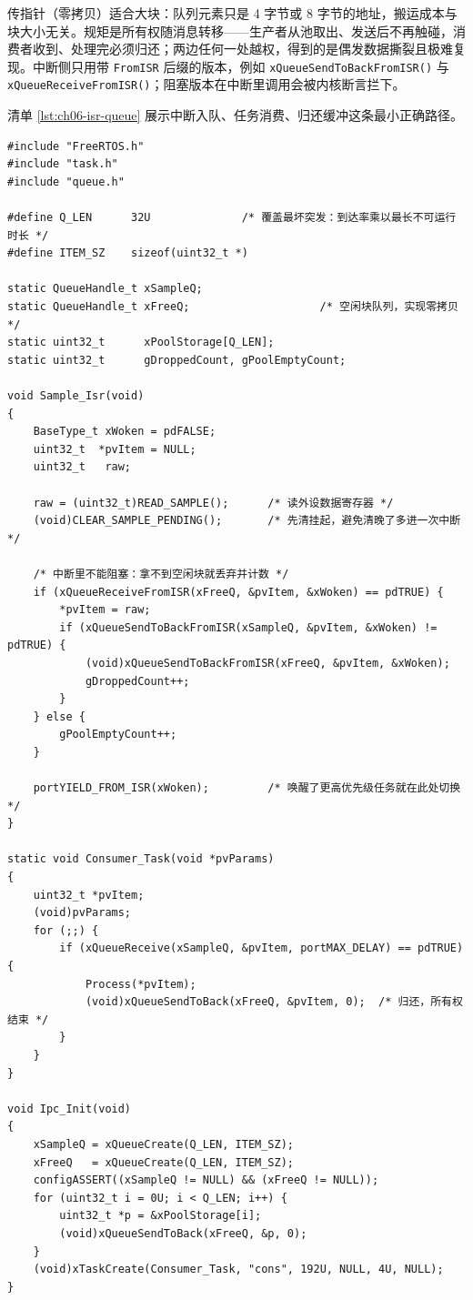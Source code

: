 \documentclass[12pt,a4paper,fontset=fandol]{ctexbook}
\newcommand{\Fn}[1]{\texttt{#1()}}
\newcommand{\Tp}[1]{\texttt{#1}}
\begin{document}
传指针（零拷贝）适合大块：队列元素只是 4 字节或 8 字节的地址，搬运成本与块大小无关。规矩是所有权随消息转移——生产者从池取出、发送后不再触碰，消费者收到、处理完必须归还；两边任何一处越权，得到的是偶发数据撕裂且极难复现。中断侧只用带 \Tp{FromISR} 后缀的版本，例如 \Fn{xQueueSendToBackFromISR} 与 \Fn{xQueueReceiveFromISR}；阻塞版本在中断里调用会被内核断言拦下。

清单 \ref{lst:ch06-isr-queue} 展示中断入队、任务消费、归还缓冲这条最小正确路径。

\begin{lstlisting}[style=cstyle,caption={C：中断经队列唤醒消费者，并用空闲块队列传递所有权},label={lst:ch06-isr-queue}]
#include "FreeRTOS.h"
#include "task.h"
#include "queue.h"

#define Q_LEN      32U              /* 覆盖最坏突发：到达率乘以最长不可运行时长 */
#define ITEM_SZ    sizeof(uint32_t *)

static QueueHandle_t xSampleQ;
static QueueHandle_t xFreeQ;                    /* 空闲块队列，实现零拷贝 */
static uint32_t      xPoolStorage[Q_LEN];
static uint32_t      gDroppedCount, gPoolEmptyCount;

void Sample_Isr(void)
{
    BaseType_t xWoken = pdFALSE;
    uint32_t  *pvItem = NULL;
    uint32_t   raw;

    raw = (uint32_t)READ_SAMPLE();      /* 读外设数据寄存器 */
    (void)CLEAR_SAMPLE_PENDING();       /* 先清挂起，避免清晚了多进一次中断 */

    /* 中断里不能阻塞：拿不到空闲块就丢弃并计数 */
    if (xQueueReceiveFromISR(xFreeQ, &pvItem, &xWoken) == pdTRUE) {
        *pvItem = raw;
        if (xQueueSendToBackFromISR(xSampleQ, &pvItem, &xWoken) != pdTRUE) {
            (void)xQueueSendToBackFromISR(xFreeQ, &pvItem, &xWoken);
            gDroppedCount++;
        }
    } else {
        gPoolEmptyCount++;
    }

    portYIELD_FROM_ISR(xWoken);         /* 唤醒了更高优先级任务就在此处切换 */
}

static void Consumer_Task(void *pvParams)
{
    uint32_t *pvItem;
    (void)pvParams;
    for (;;) {
        if (xQueueReceive(xSampleQ, &pvItem, portMAX_DELAY) == pdTRUE) {
            Process(*pvItem);
            (void)xQueueSendToBack(xFreeQ, &pvItem, 0);  /* 归还，所有权结束 */
        }
    }
}

void Ipc_Init(void)
{
    xSampleQ = xQueueCreate(Q_LEN, ITEM_SZ);
    xFreeQ   = xQueueCreate(Q_LEN, ITEM_SZ);
    configASSERT((xSampleQ != NULL) && (xFreeQ != NULL));
    for (uint32_t i = 0U; i < Q_LEN; i++) {
        uint32_t *p = &xPoolStorage[i];
        (void)xQueueSendToBack(xFreeQ, &p, 0);
    }
    (void)xTaskCreate(Consumer_Task, "cons", 192U, NULL, 4U, NULL);
}
\end{lstlisting}
\end{document}
